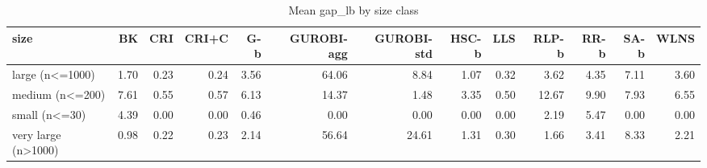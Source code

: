 \begin{table}[htbp]
\centering
\small
\caption{Mean gap\_lb by size class}
\label{tab:E4a_equal_budgets_b1_by_size}
\begin{tabular}{lrrrrrrrrrrrr}
\toprule
size & BK & CRI & CRI+C & G-b & GUROBI-agg & GUROBI-std & HSC-b & LLS & RLP-b & RR-b & SA-b & WLNS \\
\midrule
large (n<=1000) & 1.70 & 0.23 & 0.24 & 3.56 & 64.06 & 8.84 & 1.07 & 0.32 & 3.62 & 4.35 & 7.11 & 3.60 \\
medium (n<=200) & 7.61 & 0.55 & 0.57 & 6.13 & 14.37 & 1.48 & 3.35 & 0.50 & 12.67 & 9.90 & 7.93 & 6.55 \\
small (n<=30) & 4.39 & 0.00 & 0.00 & 0.46 & 0.00 & 0.00 & 0.00 & 0.00 & 2.19 & 5.47 & 0.00 & 0.00 \\
very large (n>1000) & 0.98 & 0.22 & 0.23 & 2.14 & 56.64 & 24.61 & 1.31 & 0.30 & 1.66 & 3.41 & 8.33 & 2.21 \\
\bottomrule
\end{tabular}
\end{table}
